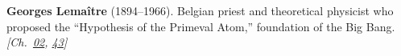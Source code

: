 \textbf{Georges Lemaître} (1894–1966). Belgian priest and theoretical physicist who proposed the ``Hypothesis of the Primeval Atom,'' foundation of the Big Bang. \emph{[Ch.~\hyperref[ch:acceleratinguniverse]{02}, \hyperref[ch:nearflatuniverse]{43}]}

